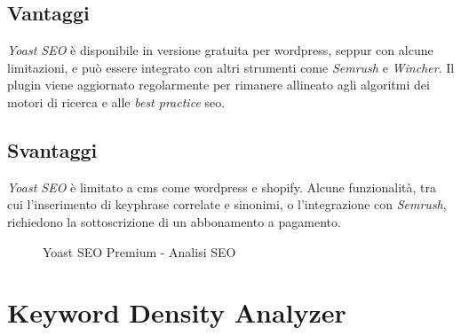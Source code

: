 \subsection{Vantaggi}
\par \textit{Yoast SEO} è disponibile in versione gratuita per \gls{wordpress}, seppur con alcune limitazioni, e può essere integrato con altri strumenti come \textit{Semrush} e \textit{Wincher}. Il plugin viene aggiornato regolarmente per rimanere allineato agli algoritmi dei motori di ricerca e alle \textit{best practice} \gls{seo}.

\subsection{Svantaggi}
\par \textit{Yoast SEO} è limitato a \gls{cms} come \gls{wordpress} e \gls{shopify}. Alcune funzionalità, tra cui l'inserimento di keyphrase correlate e sinonimi, o l'integrazione con \textit{Semrush}, richiedono la sottoscrizione di un abbonamento a pagamento.

\begin{figure}[H]
    \centering 
    \caption{Yoast SEO Premium - Analisi SEO}
\end{figure}

\section{Keyword Density Analyzer}

